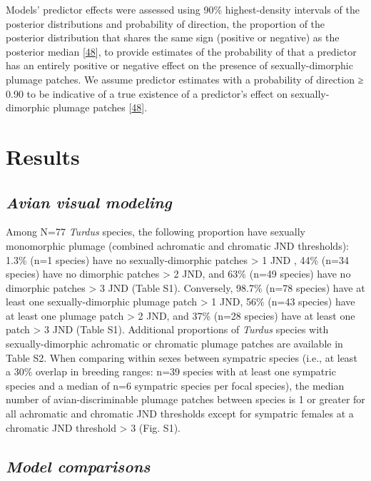 \documentclass[
  a4paper,
]{article}
\begin{document}
Models' predictor effects were assessed using 90\% highest-density
intervals of the posterior distributions and probability of direction,
the proportion of the posterior distribution that shares the same sign
(positive or negative) as the posterior median
{[}\protect\hyperlink{ref-makowski2019}{48}{]}, to provide estimates of
the probability of that a predictor has an entirely positive or negative
effect on the presence of sexually-dimorphic plumage patches. We assume
predictor estimates with a probability of direction ≥ 0.90 to be
indicative of a true existence of a predictor's effect on
sexually-dimorphic plumage patches
{[}\protect\hyperlink{ref-makowski2019}{48}{]}.

\hypertarget{results}{%
\section{Results}\label{results}}

\hypertarget{avian-visual-modeling}{%
\subsection{\texorpdfstring{\emph{Avian visual
modeling}}{Avian visual modeling}}\label{avian-visual-modeling}}

Among N=77 \emph{Turdus} species, the following proportion have sexually
monomorphic plumage (combined achromatic and chromatic JND thresholds):
1.3\% (n=1 species) have no sexually-dimorphic patches \textgreater{} 1
JND , 44\% (n=34 species) have no dimorphic patches \textgreater{} 2
JND, and 63\% (n=49 species) have no dimorphic patches \textgreater{} 3
JND (Table S1). Conversely, 98.7\% (n=78 species) have at least one
sexually-dimorphic plumage patch \textgreater{} 1 JND, 56\% (n=43
species) have at least one plumage patch \textgreater{} 2 JND, and 37\%
(n=28 species) have at least one patch \textgreater{} 3 JND (Table S1).
Additional proportions of \emph{Turdus} species with sexually-dimorphic
achromatic or chromatic plumage patches are available in Table S2. When
comparing within sexes between sympatric species (i.e., at least a 30\%
overlap in breeding ranges: n=39 species with at least one sympatric
species and a median of n=6 sympatric species per focal species), the
median number of avian-discriminable plumage patches between species is
1 or greater for all achromatic and chromatic JND thresholds except for
sympatric females at a chromatic JND threshold \textgreater{} 3 (Fig.
S1).

\hypertarget{model-comparisons}{%
\subsection{\texorpdfstring{\emph{Model
comparisons}}{Model comparisons}}\label{model-comparisons}}
\end{document}
